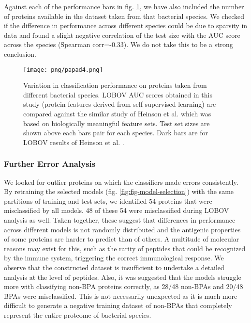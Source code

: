 \documentclass[10pt,journal,compsoc,twoside]{IEEEtran}
\begin{document}
Against each of the performance bars in fig. \ref{fig:fig-lobov}, we have also included the number of proteins available in the dataset taken from that bacterial species. We checked if the difference in performance across different species could be due to sparsity in data and found a slight negative correlation of the test size with the AUC score across the species (Spearman corr=-0.33). We do not take this to be a strong conclusion.

\begin{figure}[!t]
\centering
\texttt{[image: png/papad4.png]}
\caption{Variation in classification performance on proteins taken from different bacterial species. LOBOV AUC scores obtained in this study (protein features derived from self-supervised learning) are compared against the similar study of Heinson et al. \cite{heinson_2019} which was based on biologically meaningful feature sets. Test set sizes are shown above each bars pair for each species. Dark bars are for LOBOV results of Heinson et al. \cite{heinson_2019}.}
\label{fig:fig-lobov}
\end{figure}

\subsubsection{Further Error Analysis}
\label{sec:lobov}

We looked for outlier proteins on which the classifiers made errors consistently. By retraining the selected models (fig. \ref{fig:fig-model-selection}) with the same partitions of training and test sets, we identified 54 proteins that were misclassified by all models. 48 of these 54 were misclassified during LOBOV analysis as well. Taken together, these suggest that differences in performance across different models is not randomly distributed and the antigenic properties of some proteins are harder to predict than of others. A multitude of molecular reasons may exist for this, such as the rarity of peptides that could be recognized by the immune system, triggering the correct immunological response. We observe that the constructed dataset is insufficient to undertake a detailed analysis at the level of peptides. Also, it was suggested that the models struggle more with classifying non-BPA proteins correctly, as 28/48 non-BPAs and 20/48 BPAs were misclassified. This is not necessarily unexpected as it is much more difficult to generate a negative training dataset of non-BPAs that completely represent the entire proteome of bacterial species. 
\end{document}
